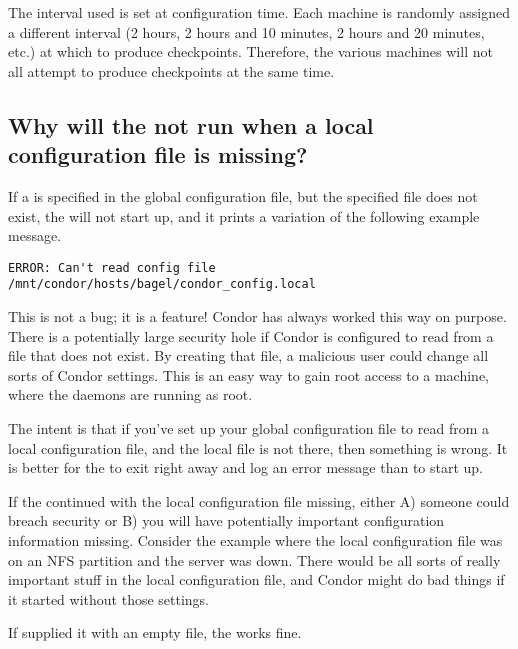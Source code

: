 The interval used is set at configuration time.
Each machine is randomly assigned a different interval 
(2 hours, 2 hours and 10 minutes, 2 hours and 20 minutes, etc.)
at which to produce checkpoints.
Therefore, the various machines will not all attempt to
produce checkpoints at the same time.

\subsection*{Why will the  not run when a local configuration file is missing?}

If a  
is specified in the global configuration file,
but the specified file does not exist,
the  will not start up, and it prints a variation
of the following example message.

\footnotesize
\begin{verbatim}
ERROR: Can't read config file /mnt/condor/hosts/bagel/condor_config.local
\end{verbatim}
\normalsize

This is not a bug; it is a feature!
Condor has always worked this way on purpose.
There is a potentially
large security hole if Condor is configured to read from a file that
does not exist.
By creating that file, a malicious user could
change all sorts of Condor settings.
This is an easy way
to gain root access to a machine,
where the daemons are running as root.

The intent is that
if you've set up your global configuration file to read
from a local configuration file, and the local file is not there,
then something is wrong.
It is better for the  to exit right away and
log an error message than to start up.

If the  continued with the local configuration file
missing, either A) someone could breach security or B) you will have
potentially important configuration information missing.
Consider the example where the local configuration file was on an NFS
partition and the server was down. 
There would be all sorts of
really important stuff in the local configuration file,
and Condor might do bad things if it started without those settings.  

If supplied it with an empty file, the  works fine.



